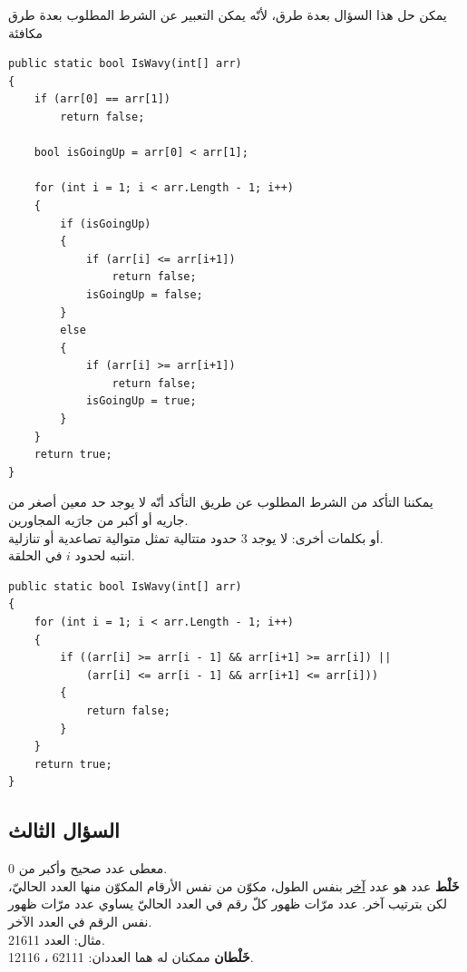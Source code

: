 \documentclass[14pt]{extarticle}
\begin{document}
\ifwithsols
يمكن حل هذا السؤال بعدة طرق، لأنّه يمكن التعبير عن الشرط المطلوب بعدة طرق مكافئة
\begin{boxSolution}
\begin{english}
\begin{verbatim}
public static bool IsWavy(int[] arr)
{
    if (arr[0] == arr[1])
        return false;

    bool isGoingUp = arr[0] < arr[1];

    for (int i = 1; i < arr.Length - 1; i++)
    {
        if (isGoingUp)
        {
            if (arr[i] <= arr[i+1])
                return false;
            isGoingUp = false;
        }
        else
        {
            if (arr[i] >= arr[i+1])
                return false;
            isGoingUp = true;
        }
    }
    return true;
}
\end{verbatim}
\end{english}
\end{boxSolution}
\begin{boxSolution}
    يمكننا التأكد من الشرط المطلوب عن طريق التأكد أنّه لا يوجد حد معين أصغر من جاريه أو أكبر من جارَيه المجاورين. \\
    أو بكلمات أخرى: لا يوجد 3 حدود متتالية تمثل متوالية تصاعدية أو تنازلية. \\
    انتبه لحدود $i$ في الحلقة.
\begin{english}
\begin{verbatim}
public static bool IsWavy(int[] arr)
{
    for (int i = 1; i < arr.Length - 1; i++)
    {
        if ((arr[i] >= arr[i - 1] && arr[i+1] >= arr[i]) ||
            (arr[i] <= arr[i - 1] && arr[i+1] <= arr[i]))
        {
            return false;
        }
    }
    return true;
}
\end{verbatim}
\end{english}
\end{boxSolution}
\fi

\clearpage
\subsection*{السؤال الثالث}

معطى عدد صحيح وأكبر من 0. \\
\textbf{خَلْط} عدد هو عدد \underline{آخر} بنفس الطول، مكوّن من نفس الأرقام المكوّن منها العدد الحاليّ، لكن بترتيب آخر. عدد مرّات ظهور كلّ رقم في العدد الحاليّ يساوي عدد مرّات ظهور نفس الرقم في العدد الآخر. \\
مثال: العدد 21611. \\
\textbf{خَلْطان} ممكنان له هما العددان: 62111 ، 12116.
\end{document}
